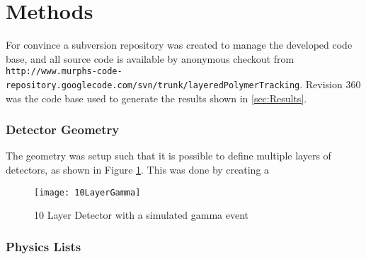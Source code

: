 \section{Methods}
\label{sec:Methods}

For convince a subversion repository was created to manage the developed code base, and all source code is available by anonymous checkout from \verb+http://www.murphs-code-repository.googlecode.com/svn/trunk/layeredPolymerTracking+. Revision 360 was the code base used to generate the results shown in \ref{sec:Results}.

\subsubsection{Detector Geometry}
The geometry was setup such that it is possible to define multiple layers of detectors, as shown in Figure \ref{fig:LayerDetectorGeo}.
This was done by creating a 
\begin{figure} 
    \texttt{[image: 10LayerGamma]}
	\caption{10 Layer Detector with a simulated gamma event}
    \label{fig:LayerDetectorGeo}
\end{figure}
\subsubsection{Physics Lists}

